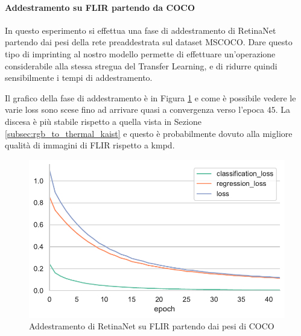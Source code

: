 \paragraph{Addestramento su FLIR partendo da COCO}
In questo esperimento si effettua una fase di addestramento di RetinaNet partendo dai pesi della rete preaddestrata sul dataset \ac{MSCOCO}. Dare questo tipo di imprinting al nostro modello permette di effettuare un'operazione considerabile alla stessa stregua del Transfer Learning, e di ridurre quindi sensibilmente i tempi di addestramento. 

Il grafico della fase di addestramento è in Figura \ref{fig:train_from_coco_FLIR} e come è possibile vedere le varie loss sono scese fino ad arrivare quasi a convergenza verso l'epoca $45$. La discesa è più stabile rispetto a quella vista in Sezione \ref{subsec:rgb_to_thermal_kaist} e questo è probabilmente dovuto alla migliore qualità di immagini di FLIR rispetto a \ac{kmpd}.  
\begin{figure}[]
    \centering
    \includegraphics[width = \textwidth]{images/graphic/train_flir_from_coco.pdf}
    \caption{Addestramento di RetinaNet su FLIR partendo dai pesi di COCO}
    \label{fig:train_from_coco_FLIR}
\end{figure}

